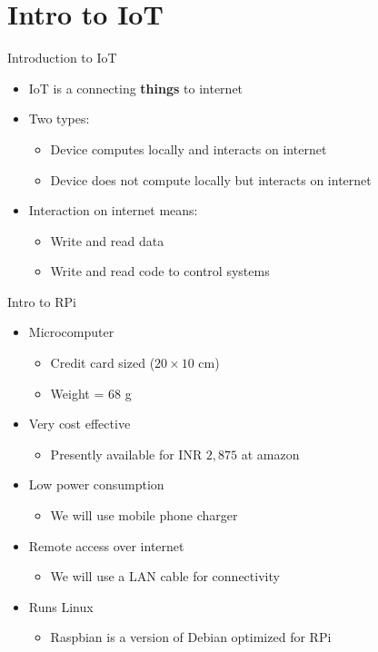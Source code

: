 \section{Intro to IoT}

\begin{frame}{Introduction to IoT}
	\begin{itemize}
		\item IoT is a connecting \textbf{things} to internet
		\item Two types:
		\begin{itemize}
			\item Device computes locally and interacts on internet
			\item Device does not compute locally but interacts on internet
		\end{itemize}
		\item Interaction on internet means:
		\begin{itemize}
			\item Write and read data
			\item Write and read code to control systems
		\end{itemize}
	\end{itemize}
\end{frame}

\begin{frame}{Intro to RPi}
	\begin{itemize}
		\item Microcomputer
		\begin{itemize}
			\item Credit card sized ($20 \times 10$ cm)
			\item Weight = $68$ g
		\end{itemize}
		\item Very cost effective
		\begin{itemize}
			\item Presently available for INR $2,875$ at amazon 
		\end{itemize}
		\item Low power consumption 
		\begin{itemize}
			\item We will use mobile phone charger
		\end{itemize}
		\item Remote access over internet
		\begin{itemize}
			\item We will use a LAN cable for connectivity
		\end{itemize}
		\item Runs Linux
		\begin{itemize}
			\item Raspbian is a version of Debian optimized for RPi
		\end{itemize}
	\end{itemize}
\end{frame}

